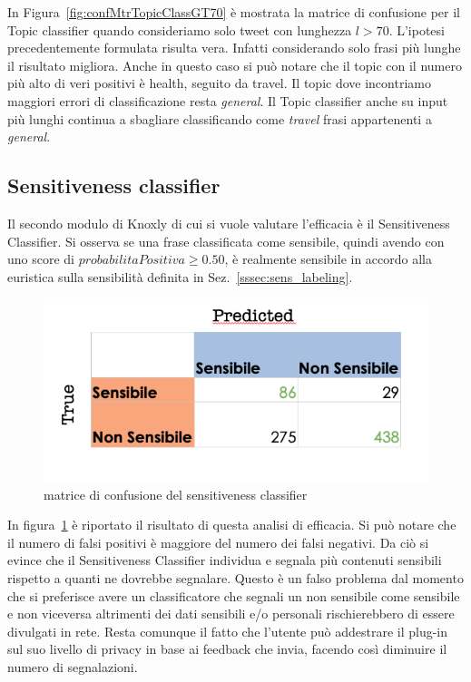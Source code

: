 In Figura~\ref{fig:confMtrTopicClassGT70} è mostrata la matrice di confusione per il Topic classifier quando consideriamo solo tweet con lunghezza $l > 70$. L'ipotesi precedentemente formulata risulta vera. Infatti considerando solo frasi più lunghe il risultato migliora. Anche in questo caso si può notare che il topic con il numero più alto di veri positivi è health, seguito da travel. Il topic dove incontriamo maggiori errori di classificazione resta \textit{general}. Il Topic classifier anche su input più lunghi continua a sbagliare classificando come \textit{travel} frasi appartenenti a \textit{general}.

\subsection{Sensitiveness classifier}
\label{sec:qualSens}
Il secondo modulo di Knoxly di cui si vuole valutare l'efficacia è il Sensitiveness Classifier. Si osserva se una frase classificata come sensibile, quindi avendo con uno score di $probabilitaPositiva \geq 0.50$, è realmente sensibile in accordo alla euristica sulla sensibilità definita in Sez.~\ref{sssec:sens_labeling}. 

\begin{figure}[h!t]
    \centering
    \includegraphics[width=15cm]{Figure/qualitativa/qualSens.png}
    \caption{matrice di confusione del sensitiveness classifier}
    \label{fig:sensitivenessevaluation}
\end{figure}
\FloatBarrier

In figura~\ref{fig:sensitivenessevaluation} è riportato il risultato di questa analisi di efficacia. Si può notare che il numero di falsi positivi è maggiore del numero dei falsi negativi. Da ciò si evince che il Sensitiveness Classifier individua e segnala più contenuti sensibili rispetto a quanti ne dovrebbe segnalare. Questo è un falso problema dal momento che si preferisce avere un classificatore che segnali un non sensibile come sensibile e non viceversa altrimenti dei dati sensibili e/o personali rischierebbero di essere divulgati in rete. Resta comunque il fatto che l'utente può addestrare il plug-in sul suo livello di privacy in base ai feedback che invia, facendo così diminuire il numero di segnalazioni.

